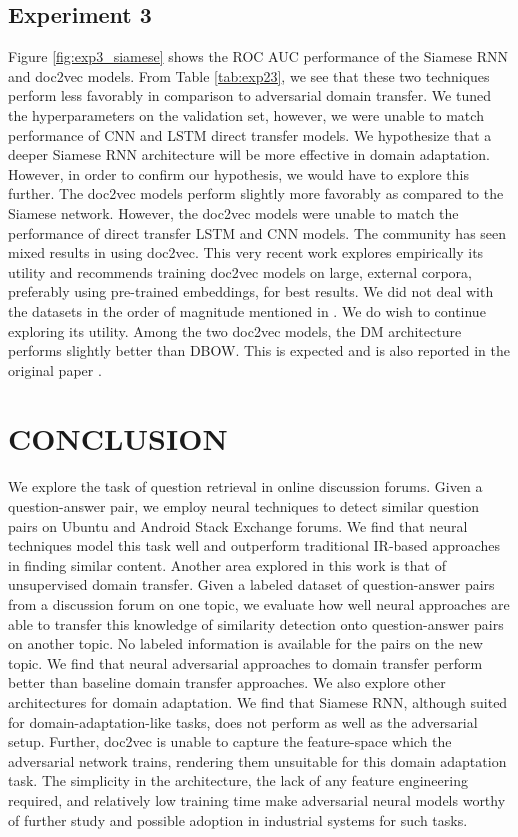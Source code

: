 \documentclass{sigkddExp}
\begin{document}
\subsection{Experiment 3}
Figure \ref{fig:exp3_siamese} shows the ROC AUC performance of the Siamese RNN and \textsf{doc2vec} models. From Table \ref{tab:exp23}, we see that these two techniques perform less favorably in comparison to adversarial domain transfer. We tuned the hyperparameters on the validation set, however, we were unable to match performance of CNN and LSTM direct transfer models. We hypothesize that a deeper Siamese RNN architecture will be more effective in domain adaptation. However, in order to confirm our hypothesis, we would have to explore this further.
The \textsf{doc2vec} models perform slightly more favorably as compared to the Siamese network. However, the \textsf{doc2vec} models were unable to match the performance of direct transfer LSTM and CNN models. The community has seen mixed results in using \textsf{doc2vec}. This very recent work explores empirically its utility \cite{doc2vec2} and recommends training \textsf{doc2vec} models on large, external corpora, preferably using pre-trained embeddings, for best results. We did not deal with the datasets in the order of magnitude mentioned in \cite{doc2vec2}. We do wish to continue exploring its utility. Among the two \textsf{doc2vec} models, the DM architecture performs slightly better than DBOW. This is expected and is also reported in the original paper \cite{doc2vec1}.

\section{CONCLUSION}
We explore the task of question retrieval in online discussion forums. Given a question-answer pair, we employ neural techniques to detect similar question pairs on Ubuntu and Android Stack Exchange forums. We find that neural techniques model this task well and outperform traditional IR-based approaches in finding similar content. Another area explored in this work is that of unsupervised domain transfer. Given a labeled dataset of question-answer pairs from a discussion forum on one topic, we evaluate how well neural approaches are able to transfer this knowledge of similarity detection onto question-answer pairs on another topic. No labeled information is available for the pairs on the new topic. We find that neural adversarial approaches to domain transfer perform better than baseline domain transfer approaches. We also explore other architectures for domain adaptation. We find that Siamese RNN, although suited for domain-adaptation-like tasks, does not perform as well as the adversarial setup. Further, \textsf{doc2vec} is unable to capture the feature-space which the adversarial network trains, rendering them unsuitable for this domain adaptation task. The simplicity in the architecture, the lack of any feature engineering required, and relatively low training time make adversarial neural models worthy of further study and possible adoption in industrial systems for such tasks. 
\end{document}
